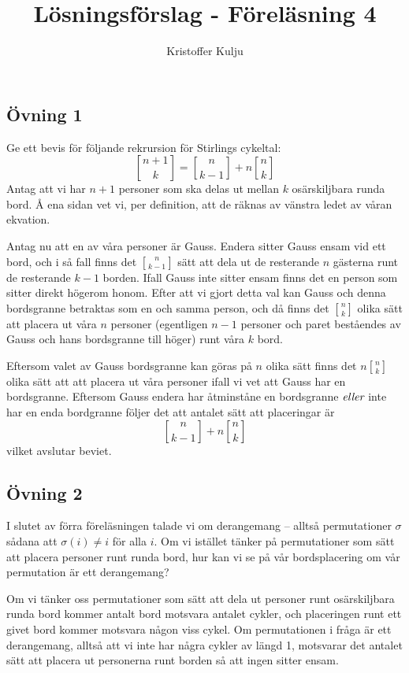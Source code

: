 \documentclass{article}
\title{Lösningsförslag - Föreläsning 4}
\author{Kristoffer Kulju}
\begin{document}
\maketitle

\subsection*{Övning 1}
Ge ett bevis för följande rekrursion för Stirlings cykeltal:
$$
{n + 1 \brack k} = {n \brack k - 1} + n{n \brack k}
$$
Antag att vi har $n+1$ personer som ska delas ut mellan $k$ osärskiljbara runda bord. Å ena sidan vet vi, per definition, att de räknas av vänstra ledet av våran ekvation. 

Antag nu att en av våra personer är Gauss. Endera sitter Gauss ensam vid ett bord, och i så fall finns det ${n \brack k - 1}$ sätt att dela ut de resterande $n$ gästerna runt de resterande $k-1$ borden. Ifall Gauss inte sitter ensam finns det en person som sitter direkt högerom honom. Efter att vi gjort detta val kan Gauss och denna bordsgranne betraktas som en och samma person, och då finns det ${n \brack k}$ olika sätt att placera ut våra $n$ personer (egentligen $n - 1$ personer och paret beståendes av Gauss och hans bordsgranne till höger) runt våra $k$ bord. 

Eftersom valet av Gauss bordsgranne kan göras på $n$ olika sätt finns det $n{n \brack k}$ olika sätt att att placera ut våra personer ifall vi vet att Gauss har en bordsgranne. Eftersom Gauss endera har åtminståne en bordsgranne $\emph{eller}$ inte har en enda bordgranne följer det att antalet sätt att placeringar är $$
{n \brack k - 1} + n{n \brack k}
$$ vilket avslutar beviet. 
\subsection*{Övning 2}
I slutet av förra föreläsningen talade vi om derangemang – alltså permutationer $\sigma$ sådana att $\sigma(i)\neq i$ för alla $i$. Om vi istället tänker på permutationer som sätt att placera personer runt runda bord, hur kan vi se på vår bordsplacering om vår permutation är ett derangemang?

Om vi tänker oss permutationer som sätt att dela ut personer runt osärskiljbara runda bord kommer antalt bord motsvara antalet cykler, och placeringen runt ett givet bord kommer motsvara någon viss cykel. Om permutationen i fråga är ett derangemang, alltså att vi inte har några cykler av längd 1, motsvarar det antalet sätt att placera ut personerna runt borden så att ingen sitter ensam. 
\end{document}
